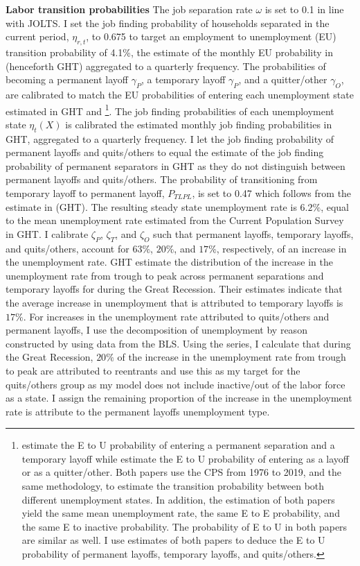 \textbf{Labor transition probabilities}    The job separation rate $\omega$ is set to 0.1 in line with JOLTS. I set the job finding probability of households separated in the current period, $\eta_{r,t}$,  to 0.675 to target an employment to unemployment (EU) transition probability of 4.1\%, the estimate of the monthly EU probability in \cite{Gertler2022} (henceforth GHT) aggregated to a quarterly frequency. The probabilities of becoming a permanent layoff $\gamma_{P}$, a temporary layoff $\gamma_{P}$, and a quitter/other $\gamma_{O}$, are calibrated to match the EU probabilities of entering each unemployment state estimated in GHT and \cite{GHT2023}\footnote{\cite{Gertler2022} estimate the E to U probability of entering a permanent separation and a temporary layoff while \cite{GHT2023} estimate the E to U probability of entering as a layoff or as a quitter/other. Both papers use the CPS from 1976 to 2019, and the same methodology, to estimate the transition probability between both different unemployment states. In addition, the estimation of both papers yield the same mean unemployment rate, the same E to E probability, and the same E to inactive probability. The probability of E to U in both papers are similar as well.  I use estimates of both papers to deduce the E to U probability of permanent layoffs, temporary layoffs, and quits/others.}. The job finding probabilities of each unemployment state $\eta_{t}(X)$ is calibrated the estimated monthly job finding probabilities in GHT, aggregated to a quarterly frequency. I let the job finding probability of permanent layoffs and quits/others to equal the estimate of the job finding probability of permanent separators in GHT as they do not distinguish between permanent layoffs and quits/others. The probability of transitioning from temporary layoff to permanent layoff, $P_{TLPL}$,  is set to 0.47 which follows from the estimate in (GHT). The resulting steady state unemployment rate is $6.2 \%$, equal to the mean unemployment rate estimated from the Current Population Survey in GHT.  I calibrate $\zeta_{P}$, $\zeta_{T}$, and $\zeta_{O}$ such that permanent layoffs, temporary layoffs, and quits/others, account for $63\%$, $20\%$, and $17\%$, respectively, of an increase in the unemployment rate. GHT estimate the distribution of the increase in the unemployment rate from trough to peak across permanent separations and temporary layoffs for during the Great Recession. Their estimates indicate that the average increase in unemployment that is attributed to temporary layoffs is $17\%$. For increases in the unemployment rate attributed to quits/others and permanent layoffs, I use the decomposition of unemployment by reason constructed by \cite{Fujita2017} using data from the BLS. Using the \cite{Fujita2017} series, I calculate that during the Great Recession, $20\%$ of the increase in the unemployment rate from trough to peak are attributed to reentrants and use this as my target for the quits/others group as my model does not include inactive/out of the labor force as a state. I assign the remaining proportion of the increase in the unemployment rate is attribute to the permanent layoffs unemployment type. \\


